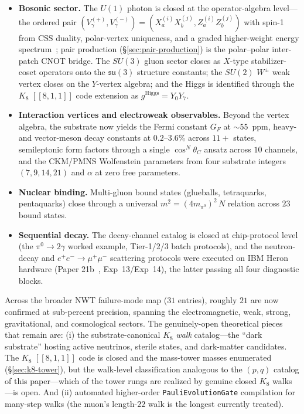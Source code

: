 \documentclass[11pt]{article}
\begin{document}
\begin{itemize}
\item \textbf{Bosonic sector.}  The $U(1)$ photon is closed at the operator-algebra level---the ordered pair $(V_\gamma^{(+)}, V_\gamma^{(-)}) = (X_a^{(i)} X_b^{(j)}, Z_a^{(i)} Z_b^{(j)})$ with spin-1 from CSS duality, polar-vertex uniqueness, and a graded higher-weight energy spectrum~\cite{BosonMemo}; pair production (\S\ref{sec:pair-production}) is the polar--polar inter-patch CNOT bridge.  The $SU(3)$ gluon sector closes as $X$-type stabilizer-coset operators onto the $\mathfrak{su}(3)$ structure constants; the $SU(2)$ $W^\pm$ weak vertex closes on the $Y$-vertex algebra; and the Higgs is identified through the $K_8$ $[[8,1,1]]$ code extension as $g^\text{Higgs} = Y_0 Y_7$.
\item \textbf{Interaction vertices and electroweak observables.}  Beyond the vertex algebra, the substrate now yields the Fermi constant $G_F$ at $\sim 55$~ppm, heavy- and vector-meson decay constants at $0.2$--$3.6\%$ across $11{+}$ states, semileptonic form factors through a single $\cos^N \theta_C$ ansatz across $10$ channels, and the CKM/PMNS Wolfenstein parameters from four substrate integers $(7, 9, 14, 21)$ and $\alpha$ at zero free parameters.
\item \textbf{Nuclear binding.}  Multi-gluon bound states (glueballs, tetraquarks, pentaquarks) close through a universal $m^2 = (4 m_{\pi^0})^2\, N$ relation across $23$ bound states.
\item \textbf{Sequential decay.}  The decay-channel catalog is closed at chip-protocol level (the $\pi^0 \to 2\gamma$ worked example, Tier-1/2/3 batch protocols), and the neutron-decay and $e^+ e^- \to \mu^+ \mu^-$ scattering protocols were executed on IBM Heron hardware (Paper 21b~\cite{Paper21b}, Exp~13/Exp~14), the latter passing all four diagnostic blocks.
\end{itemize}

Across the broader NWT failure-mode map ($31$ entries), roughly $21$ are now confirmed at sub-percent precision, spanning the electromagnetic, weak, strong, gravitational, and cosmological sectors.  The genuinely-open theoretical pieces that remain are: (i) the substrate-canonical $K_8$ \emph{walk} catalog---the ``dark substrate'' hosting active neutrinos, sterile states, and dark-matter candidates. The $K_8$ $[[8,1,1]]$ code is closed and the mass-tower masses enumerated (\S\ref{sec:k8-tower}), but the walk-level classification analogous to the $(p, q)$ catalog of this paper---which of the tower rungs are realized by genuine closed $K_8$ walks---is open. And (ii) automated higher-order \texttt{PauliEvolutionGate} compilation for many-step walks (the muon's length-$22$ walk is the longest currently treated).
\end{document}
